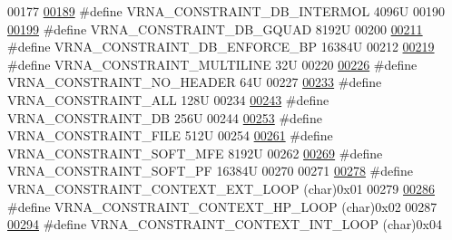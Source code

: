\begin{DoxyCode}
00177 
\hypertarget{constraints_8h_source_l00189}{}\hyperlink{group__constraints_ga31d0ebb9755ca8a4acafc14f00ca755d}{00189} \textcolor{preprocessor}{#define VRNA\_CONSTRAINT\_DB\_INTERMOL    4096U}
00190 
\hypertarget{constraints_8h_source_l00199}{}\hyperlink{group__constraints_ga75cfab03cdc97c95b3ce8bb29f52b08e}{00199} \textcolor{preprocessor}{#define VRNA\_CONSTRAINT\_DB\_GQUAD                8192U}
00200 
\hypertarget{constraints_8h_source_l00211}{}\hyperlink{group__constraints_ga29ebe940110d60ab798fdacbcdbbfb7d}{00211} \textcolor{preprocessor}{#define VRNA\_CONSTRAINT\_DB\_ENFORCE\_BP           16384U}
00212 
\hypertarget{constraints_8h_source_l00219}{}\hyperlink{group__hard__constraints_ga7d725ef525b29891abef3f1ed42599a4}{00219} \textcolor{preprocessor}{#define VRNA\_CONSTRAINT\_MULTILINE         32U}
00220 
\hypertarget{constraints_8h_source_l00226}{}\hyperlink{group__hard__constraints_ga08d12a9a846ea593b7171d277c9f033f}{00226} \textcolor{preprocessor}{#define VRNA\_CONSTRAINT\_NO\_HEADER         64U}
00227 
\hypertarget{constraints_8h_source_l00233}{}\hyperlink{group__constraints_ga0a697f77a6fbb10f34e16fa68ed9e655}{00233} \textcolor{preprocessor}{#define VRNA\_CONSTRAINT\_ALL               128U}
00234 
\hypertarget{constraints_8h_source_l00243}{}\hyperlink{group__constraints_ga4bfc2f15c4f261c62a11af9d2aa80c90}{00243} \textcolor{preprocessor}{#define VRNA\_CONSTRAINT\_DB                256U}
00244 
\hypertarget{constraints_8h_source_l00253}{}\hyperlink{group__constraints_ga62e0ed0c33002c09423de4e646f85a2b}{00253} \textcolor{preprocessor}{#define VRNA\_CONSTRAINT\_FILE              512U}
00254 
\hypertarget{constraints_8h_source_l00261}{}\hyperlink{group__soft__constraints_ga62aa195893d02d1a79ca94952748df36}{00261} \textcolor{preprocessor}{#define VRNA\_CONSTRAINT\_SOFT\_MFE          8192U}
00262 
\hypertarget{constraints_8h_source_l00269}{}\hyperlink{group__soft__constraints_ga03fb5000c19b9a2082bf4ea30a543045}{00269} \textcolor{preprocessor}{#define VRNA\_CONSTRAINT\_SOFT\_PF           16384U}
00270 
00271 
\hypertarget{constraints_8h_source_l00278}{}\hyperlink{group__hard__constraints_ga9418eda62a5dec070896702c279d2548}{00278} \textcolor{preprocessor}{#define VRNA\_CONSTRAINT\_CONTEXT\_EXT\_LOOP      (char)0x01}
00279 
\hypertarget{constraints_8h_source_l00286}{}\hyperlink{group__hard__constraints_ga79203702b197b6b9d3b78eed40663eb1}{00286} \textcolor{preprocessor}{#define VRNA\_CONSTRAINT\_CONTEXT\_HP\_LOOP       (char)0x02}
00287 
\hypertarget{constraints_8h_source_l00294}{}\hyperlink{group__hard__constraints_ga21feeab3a9e5fa5a9e3d9ac0fcf5994f}{00294} \textcolor{preprocessor}{#define VRNA\_CONSTRAINT\_CONTEXT\_INT\_LOOP      (char)0x04}

\end{DoxyCode}
